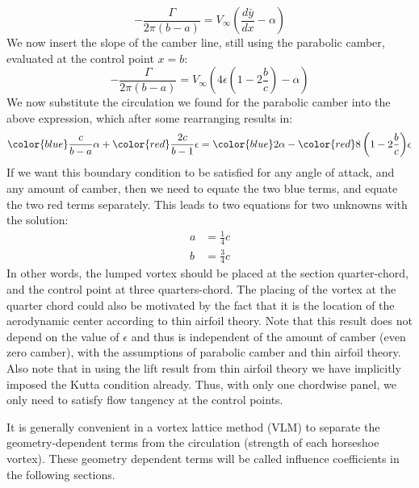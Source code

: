 \documentclass{article}
\begin{document}
\begin{equation}
-\frac{\Gamma}{2 \pi (b - a)} = V_\infty \left(\frac{d\bar{y}}{dx} - \alpha \right)
\end{equation}
We now insert the slope of the camber line, still using the parabolic camber, evaluated at the control point $x = b$:
\begin{equation}
-\frac{\Gamma}{2 \pi (b - a)} = V_\infty \left(4 \epsilon \left(1 - 2 \frac{b}{c} \right) - \alpha \right)
\end{equation}
We now substitute the circulation we found for the parabolic camber into the above expression, which after some rearranging results in:
\begin{equation}
{\color{blue}\frac{c}{b - a}} \alpha + {\color{red}\frac{2c}{b -1}} \epsilon = {\color{blue}2} \alpha - {\color{red}8\left(1 - 2 \frac{b}{c} \right)}\epsilon
\end{equation}
If we want this boundary condition to be satisfied for any angle of attack, and any amount of camber, then we need to equate the two blue terms, and equate the two red terms separately.  This leads to two equations for two unknowns with the solution:
\begin{align}
a &= \frac{1}{4} c\\
b &= \frac{3}{4} c
\end{align}
In other words, the lumped vortex should be placed at the section quarter-chord, and the control point at three quarters-chord.  The placing of the vortex at the quarter chord could also be motivated by the fact that it is the location of the aerodynamic center according to thin airfoil theory.  Note that this result does not depend on the value of $\epsilon$ and thus is independent of the amount of camber (even zero camber), with the assumptions of parabolic camber and thin airfoil theory.  Also note that in using the lift result from thin airfoil theory we have implicitly imposed the Kutta condition already. Thus, with only one chordwise panel, we only need to satisfy flow tangency at the control points.


It is generally convenient in a vortex lattice method (VLM) to separate the geometry-dependent terms from the circulation (strength of each horseshoe vortex).  These geometry dependent terms will be called influence coefficients in the following sections.
\end{document}
